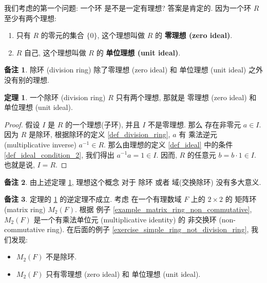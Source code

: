 \documentclass[utf8]{ctexbook}
\theoremstyle{definition}
\newtheorem{prototheorem}{定理}[section]
\newenvironment{theorem}
   {\colorlet{shadecolor}{red!30}\begin{shaded}\begin{prototheorem}}
   {\end{prototheorem}\end{shaded}}
\newtheorem{memo}{备注}[section]
\begin{document}
我们考虑的第一个问题: 一个环 是不是一定有理想? 答案是肯定的. 因为一个环 $R$ 至少有两个理想:
\begin{enumerate}
\item{只有 $R$ 的零元的集合 $\{ 0 \}$, 这个理想叫做 $R$ 的 \textbf{零理想 (zero ideal)}.}
\item{$R$ 自己, 这个理想叫做 $R$ 的 \textbf{单位理想 (unit ideal)}.}
\end{enumerate}

\begin{memo}
除环 (division ring) 除了零理想 (zero ideal) 和 单位理想 (unit ideal) 之外 没有别的理想.
\end{memo}

\begin{theorem}\label{theorem_2_7_1_division_ring_two_ideals}
一个除环 (division ring) $R$ 只有两个理想, 那就是 零理想 (zero ideal) 和 单位理想 (unit ideal).
\end{theorem}

\begin{proof}
假设 $I$ 是 $R$ 的一个理想(子环), 并且 $I$ 不是零理想. 那么 存在非零元 $a \in I$. 因为 $R$ 是除环, 根据除环的定义 \ref{def_division_ring}, $a$ 有 乘法逆元 (multiplicative inverse) $a^{-1} \in R $. 那么由理想的定义 \ref{def_ideal} 中的条件 \ref{def_ideal_condition_2}, 我们得出  $a^{-1} a = 1 \in I $. 因而, $R$ 的任意元  $b= b \cdot 1 \in I$. 也就是说, $I=R$.
\end{proof}

\begin{memo}
由上述定理 \ref{theorem_2_7_1_division_ring_two_ideals}, 理想这个概念 对于 除环 或者 域(交换除环) 没有多大意义. 
\end{memo}

\begin{memo}\label{memo_simple_ring_not_division_ring}
定理的 \ref{theorem_2_7_1_division_ring_two_ideals} 的逆定理不成立. 考虑 在一个有理数域 $F$ 上的 $2 \times 2$ 的 矩阵环 (matrix ring) $M_{2} (F)$. 根据 例子 \ref{example_matrix_ring_non_commutative}, $M_{2} (F)$ 是一个有乘法单位元 (multiplicative identity) 的 非交换环 (non-commutative ring). 在后面的例子 \ref{exercise_simple_ring_not_division_ring}, 我们发现:
\begin{itemize}
\item{$M_{2} (F)$ 不是除环.}
\item{$M_{2} (F)$ 只有零理想 (zero ideal) 和 单位理想 (unit ideal).}
\end{itemize}
\end{memo}
\end{document}

